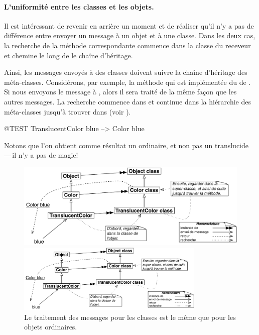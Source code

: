 \documentclass[a4paper,10pt,twoside]{book}
\begin{document}
\paragraph{L'uniformité entre les classes et les objets.}
Il est intéressant de revenir en arrière un moment et de réaliser qu'il n'y a pas de différence entre envoyer un message à un objet et à une classe.
Dans les deux cas, la recherche de la méthode correspondante commence dans la classe du receveur et chemine le long de le chaîne d'héritage.

Ainsi, les messages envoyés à des classes doivent suivre la chaîne d'héritage des méta-classes. 
Considérons, par exemple, la méthode  qui est implémentée du  de .
Si nous envoyons le message  à , alors il sera traité de la même façon que les autres messages.
La recherche commence dans  et continue dans la hiérarchie des méta-classes jusqu'à trouver dans   (voir ).

\begin{code}{@TEST}
TranslucentColor blue --> Color blue
\end{code}
\noindent
Notons que l'on obtient comme résultat un   ordinaire, et non pas un translucide\,---\,il n'y a pas de magie!

\begin{center}
\begin{figure}[!ht]
\ifluluelse
	{\centerline {\includegraphics[width=\textwidth]{TranslucentColorBlue}}}
	{\centerline {\includegraphics[width=0.8\textwidth]{TranslucentColorBlue}}}
\caption{Le traitement des messages pour les classes est le même que pour les objets ordinaires.\label{fig:metaclasslookup}}
\end{figure}
\end{center}
\end{document}
